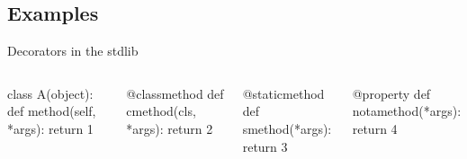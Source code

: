\documentclass{beamer}
\begin{document}
\subsection{Examples}

\begin{frame}[fragile]{Decorators in the stdlib}
  \begin{columns}[t]
    \pause
    \begin{pycode}
    class A(object):
       def method(self, *args):
          return 1
    \end{pycode}
    \pause
    \begin{pycode}
       @classmethod
       def cmethod(cls, *args):
          return 2
    \end{pycode}
    \pause
    \begin{pycode}
       @staticmethod
       def smethod(*args):
          return 3
    \end{pycode}
    \pause
    \begin{pycode}
       @property
       def notamethod(*args):
          return 4
    \end{pycode}

  \end{columns}
\end{frame}
\end{document}
